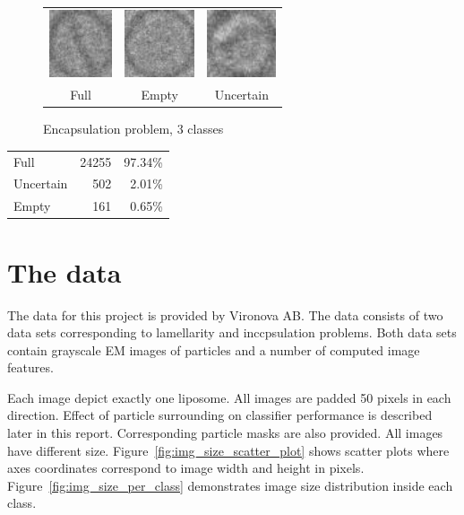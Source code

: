 \documentclass[a4paper, 11pt, table]{article}
\begin{document}
\begin{figure}[H]
\centering
\begin{tabular}{ccc}
	\includegraphics[height=2cm, keepaspectratio]{problem_description/packiging/full} & \includegraphics[height=2cm, keepaspectratio]{problem_description/packiging/empty} & \includegraphics[height=2cm, keepaspectratio]{problem_description/packiging/uncertain} \\
	Full & Empty & Uncertain \\[6pt]
\end{tabular}
\caption{Encapsulation problem, 3 classes}
\label{fig:encapsulation_problem}
\end{figure}


\begin{center}
\label{table:encapsulation_dataset}
\begin{tabular}{lrr}
\toprule
Full & \num{24255} & 97.34\% \\ 
Uncertain & \num{502} & 2.01\% \\ 
Empty & \num{161} & 0.65\% \\ 
\end{tabular} 
\end{center}

\section{The data}
\label{sec:dataset}
The data for this project is provided by Vironova AB. The data consists of two data sets corresponding to lamellarity and inccpsulation problems. Both data sets contain grayscale EM images of particles and a number of computed image features.

Each image depict exactly one liposome. All images are padded 50 pixels in each direction. Effect of particle surrounding on classifier performance is described later in this report. Corresponding particle masks are also provided. All images have different size. Figure~\ref{fig:img_size_scatter_plot} shows scatter plots where axes coordinates correspond to image width and height in pixels. Figure~\ref{fig:img_size_per_class} demonstrates image size distribution inside each class. 
\end{document}
